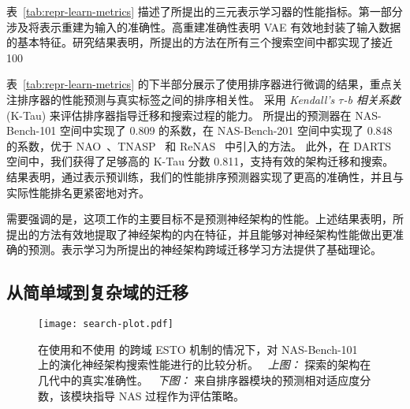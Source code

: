 \documentclass[../main_zh.tex]{subfiles}
\begin{document}
表~\ref{tab:repr-learn-metrics} 描述了所提出的三元表示学习器的性能指标。第一部分涉及将表示重建为输入的准确性。高重建准确性表明 VAE 有效地封装了输入数据的基本特征。研究结果表明，所提出的方法在所有三个搜索空间中都实现了接近 100%

表~\ref{tab:repr-learn-metrics} 的下半部分展示了使用排序器进行微调的结果，重点关注排序器的性能预测与真实标签之间的排序相关性。
采用 \textit{Kendall's \( \tau \)-b 相关系数} (K-Tau) 来评估排序器指导迁移和搜索过程的能力。
所提出的预测器在 NAS-Bench-101 空间中实现了 0.809 的系数，在 NAS-Bench-201 空间中实现了 0.848 的系数，优于 NAO~\cite{DBLP:journals/corr/abs-1712-03351}、TNASP~\cite{E2EPPSun2023} 和 ReNAS~\cite{DBLP:conf/cvpr/Xu00TJX021} 中引入的方法。
此外，在 DARTS 空间中，我们获得了足够高的 K-Tau 分数 0.811，支持有效的架构迁移和搜索。
结果表明，通过表示预训练，我们的性能排序预测器实现了更高的准确性，并且与实际性能排名更紧密地对齐。

需要强调的是，这项工作的主要目标不是预测神经架构的性能。上述结果表明，所提出的方法有效地提取了神经架构的内在特征，并且能够对神经架构性能做出更准确的预测。表示学习为所提出的神经架构跨域迁移学习方法提供了基础理论。

\subsection{从简单域到复杂域的迁移}

\begin{figure}[t]
  \centering
  \texttt{[image: search-plot.pdf]}
  \caption{
    在使用和不使用 \OUR{} 的跨域 ESTO 机制的情况下，对 NAS-Bench-101 上的演化神经架构搜索性能进行的比较分析。
    \ \textit{上图：} 探索的架构在几代中的真实准确性。
    \ \textit{下图：} 来自排序器模块的预测相对适应度分数，该模块指导 NAS 过程作为评估策略。
  }\label{fig:search-process-plot}
\end{figure}
\end{document}
